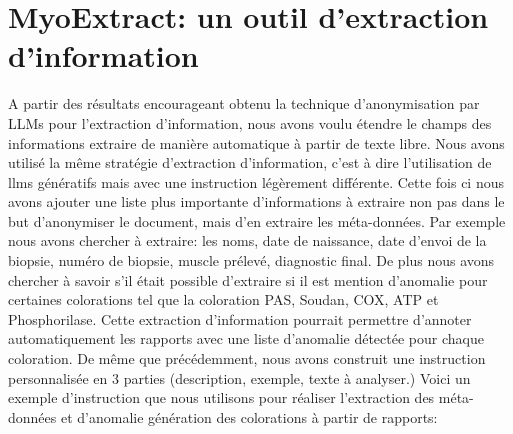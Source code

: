 \section{MyoExtract: un outil d'extraction d'information}
A partir des résultats encourageant obtenu la technique d'anonymisation par LLMs pour l'extraction d'information, nous avons voulu étendre le champs des informations extraire de manière automatique à partir de texte libre. Nous avons utilisé la même stratégie d'extraction d'information, c'est à dire l'utilisation de \gls{llms} génératifs mais avec une instruction légèrement différente. Cette fois ci nous avons ajouter une liste plus importante d'informations à extraire non pas dans le but d'anonymiser le document, mais d'en extraire les méta-données. Par exemple nous avons chercher à extraire: les noms, date de naissance, date d'envoi de la biopsie, numéro de biopsie, muscle prélevé, diagnostic final. De plus nous avons chercher à savoir s'il était possible d'extraire si il est mention d'anomalie pour certaines colorations tel que la coloration PAS, Soudan, COX, ATP et Phosphorilase. Cette extraction d'information pourrait permettre d'annoter automatiquement les rapports avec une liste d'anomalie détectée pour chaque coloration. De même que précédemment, nous avons construit une instruction personnalisée en 3 parties (description, exemple, texte à analyser.)
Voici un exemple d'instruction que nous utilisons pour réaliser l'extraction des méta-données et d'anomalie génération des colorations à partir de rapports:
